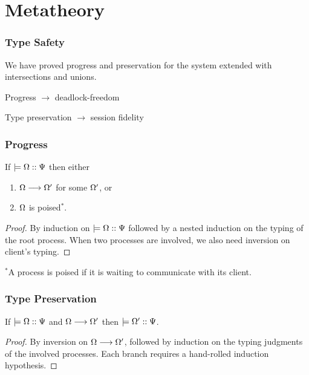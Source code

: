 \documentclass{beamer}
\begin{document}
\section{Metatheory}

\begin{frame}
  \frametitle{Type Safety}
  We have proved progress and preservation for the system extended with intersections and unions.

  \pause
  \bigskip
  Progress $\rightarrow$ deadlock-freedom

  \bigskip
  Type preservation $\rightarrow$ session fidelity
\end{frame}


\begin{frame}
  \frametitle{Progress}
  \begin{theorem}[Progress]
    If $\models {\Omega} :: {\Psi}$ then either
    \begin{enumerate}
      \item $\Omega \longrightarrow \Omega'$ for some $\Omega'$, or
      \item $\Omega$ is poised$^*$.
    \end{enumerate}
  \end{theorem}
  \begin{proof}
    By induction on $\models {\Omega} :: {\Psi}$ followed by a nested induction on the typing of the root process. When two processes are involved, we also need inversion on client's typing.
  \end{proof}

\bigskip

$^*$A process is poised if it is waiting to communicate with its client.

\end{frame}


\begin{frame}
  \frametitle{Type Preservation}
  \begin{theorem}[Preservation]
    If $\models {\Omega} :: {\Psi}$ and $\Omega \longrightarrow \Omega'$ then $\models {\Omega'} :: {\Psi}$.
  \end{theorem}
\begin{proof}
  By inversion on $\Omega \longrightarrow \Omega'$, followed by induction on the typing judgments of the involved processes. Each branch requires a hand-rolled induction hypothesis.
\end{proof}

\end{frame}
\end{document}
